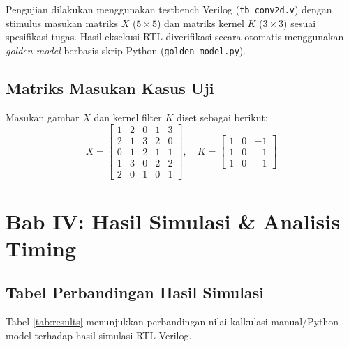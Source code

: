 \documentclass[12pt,a4paper]{article}
\begin{document}
Pengujian dilakukan menggunakan testbench Verilog (\texttt{tb\_conv2d.v}) dengan stimulus masukan matriks $X$ ($5\times5$) dan matriks kernel $K$ ($3\times3$) sesuai spesifikasi tugas. Hasil eksekusi RTL diverifikasi secara otomatis menggunakan \textit{golden model} berbasis skrip Python (\texttt{golden\_model.py}).

\subsection{Matriks Masukan Kasus Uji}
Masukan gambar $X$ dan kernel filter $K$ diset sebagai berikut:
\begin{equation}
X = \begin{bmatrix}
1 & 2 & 0 & 1 & 3 \\
2 & 1 & 3 & 2 & 0 \\
0 & 1 & 2 & 1 & 1 \\
1 & 3 & 0 & 2 & 2 \\
2 & 0 & 1 & 0 & 1
\end{bmatrix}, \quad
K = \begin{bmatrix}
1 & 0 & -1 \\
1 & 0 & -1 \\
1 & 0 & -1
\end{bmatrix}
\end{equation}

\section{Bab IV: Hasil Simulasi \& Analisis Timing}

\subsection{Tabel Perbandingan Hasil Simulasi}
Tabel \ref{tab:results} menunjukkan perbandingan nilai kalkulasi manual/Python model terhadap hasil simulasi RTL Verilog.
\end{document}
